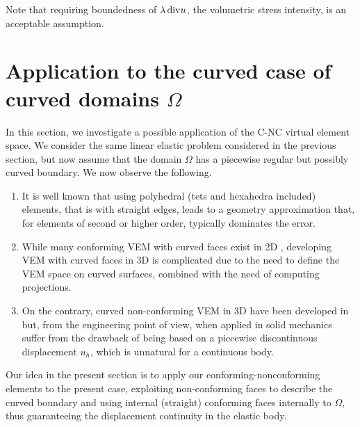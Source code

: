 \documentclass[a4paper,11pt]{article}
\theoremstyle{remark}
\theoremstyle{definition}
\begin{document}
Note that requiring boundedness of $\lambda \, {\rm div} u$, the volumetric stress intensity, is an acceptable assumption.

\section{Application to the curved case of curved domains \texorpdfstring{$\Omega$}{Omega}}\label{sec:3}

In this section, we investigate a possible application of the C-NC virtual element space.
We consider the same linear elastic problem considered in the previous section, but now assume that the domain $\Omega$ has a piecewise regular but possibly curved boundary. We now observe the following.
\begin{enumerate}
\item It is well known that using polyhedral (tets and hexahedra included) elements, that is with straight edges, leads to a geometry approximation that, for elements of second or higher order, typically dominates the error.
\item While many conforming VEM with curved faces exist in 2D \cite{BeiraodaVeiga-Russo-Vacca:2019, Bertoluzza-Pennacchio-Prada:2019, Aldakheel2020, BeiraodaVeiga-Brezzi-Marini-Russo:2020}, developing VEM with curved faces in 3D is complicated \cite{curved3D} due to the need to define the VEM space on curved surfaces, combined with the need of computing projections. 
\item On the contrary, curved non-conforming VEM in 3D have been developed in \cite{curvo-Yi} but, from the engineering point of view, when applied in solid mechanics suffer from the drawback of being based on a piecewise discontinuous displacement $u_h$, which is unnatural for a continuous body. 
\end{enumerate}

Our idea in the present section is to apply our conforming-nonconforming elements to the present case, exploiting non-conforming faces to describe the curved boundary and using internal (straight) conforming faces internally to $\Omega$, thus guaranteeing the displacement continuity in the elastic body.
\end{document}
